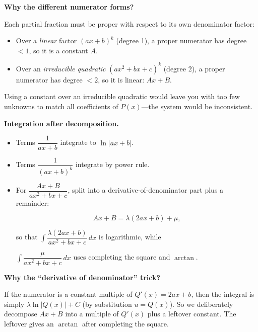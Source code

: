 \textbf{Why the different numerator forms?}

Each partial fraction must be proper with respect to its own denominator factor:
\begin{itemize}[leftmargin=*]
\item Over a \emph{linear} factor $(ax+b)^k$ (degree 1), a proper numerator has degree $<1$, so it is a constant $A$.
\item Over an \emph{irreducible quadratic} $(ax^2+bx+c)^k$ (degree 2), a proper numerator has degree $<2$, so it is linear: $Ax+B$.
\end{itemize}
Using a constant over an irreducible quadratic would leave you with too few unknowns to match all coefficients of $P(x)$---the system would be inconsistent.

\noindent
\textbf{Integration after decomposition.}

\begin{itemize}
\item Terms $\dfrac{1}{ax+b}$ integrate to $\ln|ax+b|$.
\item Terms $\dfrac{1}{(ax+b)^k}$ integrate by power rule.
\item For $\dfrac{Ax+B}{ax^2+bx+c}$, split into a derivative-of-denominator part plus a remainder:

\[
Ax+B = \lambda(2ax+b) + \mu,
\]

so that $\int \dfrac{\lambda(2ax+b)}{ax^2+bx+c}\,dx$ is logarithmic, while

$\int \dfrac{\mu}{ax^2+bx+c}\,dx$ uses completing the square and $\arctan$.

\end{itemize}

\textbf{Why the ``derivative of denominator'' trick?}

If the numerator is a constant multiple of $Q'(x)=2ax+b$, then the integral is simply $\lambda\ln|Q(x)|+C$ (by substitution $u=Q(x)$). So we deliberately decompose $Ax+B$ into a multiple of $Q'(x)$ plus a leftover constant. The leftover gives an $\arctan$ after completing the square.

